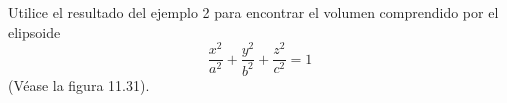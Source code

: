 \item Utilice el resultado del ejemplo 2 para encontrar el volumen comprendido por el elipsoide
    \[ \frac{x^2}{a^2} + \frac{y^2}{b^2} + \frac{z^2}{c^2} = 1 \]
    (Véase la figura 11.31).
